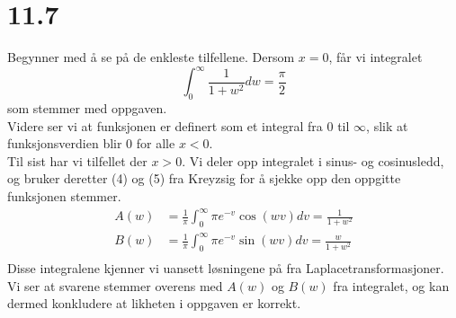 \documentclass[11pt, a4paper, norsk]{NTNUoving}
\begin{document}
\section*{11.7}
\begin{oppgave}[1]
Begynner med å se på de enkleste tilfellene. Dersom $x=0$, får vi integralet
\[
\int_0^{\infty} \frac{1}{1+w^2} dw = \frac{\pi}{2}
\]
som stemmer med oppgaven.\\
Videre ser vi at funksjonen er definert som et integral fra $0$ til $\infty$, slik at funksjonsverdien blir $0$ for alle $x<0$.\\
Til sist har vi tilfellet der $x>0$. Vi deler opp integralet i sinus- og cosinusledd, og bruker deretter (4) og (5) fra Kreyzsig for å sjekke opp den oppgitte funksjonen stemmer.
\begin{align*}
A(w)&=\frac{1}{\pi}\int_0^{\infty}\pi e^{-v}\cos(wv)dv = \frac{1}{1+w^2}\\ 
B(w)&=\frac{1}{\pi}\int_0^{\infty}\pi e^{-v}\sin(wv)dv = \frac{w}{1+w^2}\\ 
\end{align*}
Disse integralene kjenner vi uansett løsningene på fra Laplacetransformasjoner. Vi ser at svarene stemmer overens med $A(w)$ og $B(w)$ fra integralet, og kan dermed konkludere at likheten i oppgaven er korrekt.
\end{oppgave}
\end{document}
